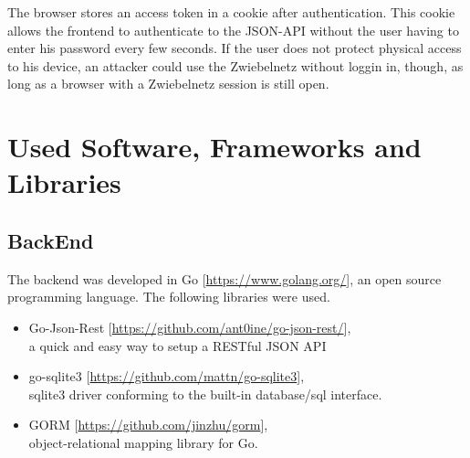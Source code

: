 \documentclass[12pt]{article}
\begin{document}
The browser stores an access token in a cookie after authentication. This cookie allows the frontend to authenticate to the JSON-API without the user having to enter his password every few seconds. If the user does not protect physical access to his device, an attacker could use the Zwiebelnetz without loggin in, though, as long as a browser with a Zwiebelnetz session is still open.

\section{Used Software, Frameworks and Libraries}

\subsection{BackEnd}
The backend was developed in Go [\url{https://www.golang.org/}], an open source programming language. The following libraries were used.
  \begin{itemize}
    \item Go-Json-Rest [\url{https://github.com/ant0ine/go-json-rest/}],\\a quick and easy way to setup a RESTful JSON API
    \item go-sqlite3 [\url{https://github.com/mattn/go-sqlite3}],\\sqlite3 driver conforming to the built-in database/sql interface.
    \item GORM [\url{https://github.com/jinzhu/gorm}],\\object-relational mapping library for Go.
  \end{itemize}
\end{document}
